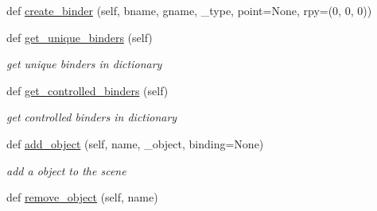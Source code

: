 \begin{DoxyCompactItemize}
def \hyperlink{classrnb-planning_1_1src_1_1pkg_1_1planning_1_1scene_1_1_planning_scene_a2e94ca6db10630aaacf908d9a9a74c50}{create\+\_\+binder} (self, bname, gname, \+\_\+type, point=None, rpy=(0, 0, 0))
\item 
\mbox{\label{classrnb-planning_1_1src_1_1pkg_1_1planning_1_1scene_1_1_planning_scene_a2c51e54199eb66a9d2772ff56b90e030}} 
def \hyperlink{classrnb-planning_1_1src_1_1pkg_1_1planning_1_1scene_1_1_planning_scene_a2c51e54199eb66a9d2772ff56b90e030}{get\+\_\+unique\+\_\+binders} (self)
\begin{DoxyCompactList}\small\item\em get unique binders in dictionary \end{DoxyCompactList}\item 
\mbox{\label{classrnb-planning_1_1src_1_1pkg_1_1planning_1_1scene_1_1_planning_scene_a93010bca4013ae5c1819427813856180}} 
def \hyperlink{classrnb-planning_1_1src_1_1pkg_1_1planning_1_1scene_1_1_planning_scene_a93010bca4013ae5c1819427813856180}{get\+\_\+controlled\+\_\+binders} (self)
\begin{DoxyCompactList}\small\item\em get controlled binders in dictionary \end{DoxyCompactList}\item 
\mbox{\label{classrnb-planning_1_1src_1_1pkg_1_1planning_1_1scene_1_1_planning_scene_aeba291d42c349240d00341ca7066dca6}} 
def \hyperlink{classrnb-planning_1_1src_1_1pkg_1_1planning_1_1scene_1_1_planning_scene_aeba291d42c349240d00341ca7066dca6}{add\+\_\+object} (self, name, \+\_\+object, binding=None)
\begin{DoxyCompactList}\small\item\em add a object to the scene \end{DoxyCompactList}\item 
\mbox{\label{classrnb-planning_1_1src_1_1pkg_1_1planning_1_1scene_1_1_planning_scene_abcce65abfb45f4b6807461868d254204}} 
def \hyperlink{classrnb-planning_1_1src_1_1pkg_1_1planning_1_1scene_1_1_planning_scene_abcce65abfb45f4b6807461868d254204}{remove\+\_\+object} (self, name)

\end{DoxyCompactItemize}
